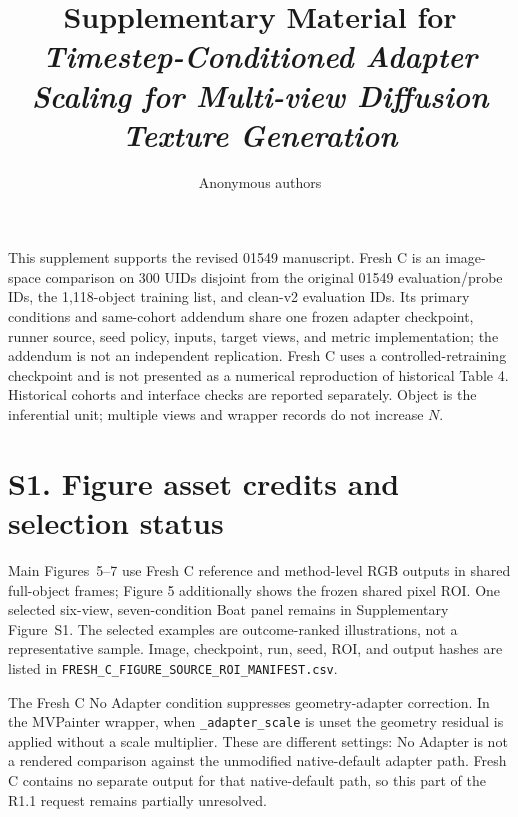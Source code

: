 \documentclass[11pt]{article}
\title{Supplementary Material for\\\emph{Timestep-Conditioned Adapter Scaling for Multi-view Diffusion Texture Generation}}
\author{Anonymous authors}
\date{}
\begin{document}
\maketitle
\noindent This supplement supports the revised 01549 manuscript. Fresh C is an image-space comparison on 300 UIDs disjoint from the original 01549 evaluation/probe IDs, the 1,118-object training list, and clean-v2 evaluation IDs. Its primary conditions and same-cohort addendum share one frozen adapter checkpoint, runner source, seed policy, inputs, target views, and metric implementation; the addendum is not an independent replication. Fresh C uses a controlled-retraining checkpoint and is not presented as a numerical reproduction of historical Table 4. Historical cohorts and interface checks are reported separately. Object is the inferential unit; multiple views and wrapper records do not increase $N$.

\section*{S1. Figure asset credits and selection status}
Main Figures~5--7 use Fresh C reference and method-level RGB outputs in shared full-object frames; Figure 5 additionally shows the frozen shared pixel ROI. One selected six-view, seven-condition Boat panel remains in Supplementary Figure~S1. The selected examples are outcome-ranked illustrations, not a representative sample. Image, checkpoint, run, seed, ROI, and output hashes are listed in \texttt{FRESH\_C\_FIGURE\_SOURCE\_ROI\_MANIFEST.csv}.

The Fresh C No Adapter condition suppresses geometry-adapter correction. In the MVPainter wrapper, when \texttt{\_adapter\_scale} is unset the geometry residual is applied without a scale multiplier. These are different settings: No Adapter is not a rendered comparison against the unmodified native-default adapter path. Fresh C contains no separate output for that native-default path, so this part of the R1.1 request remains partially unresolved.
\end{document}
